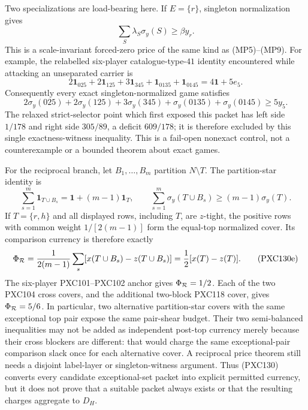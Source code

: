 \documentclass[11pt]{article}
\newcommand{\one}{\mathbf 1}
\begin{document}
Two specializations are load-bearing here.  If $E=\{r\}$, singleton
normalization gives
\begin{equation}
                 \sum_S\lambda_S\sigma_y(S)\ge\beta y_r.
                                                               \tag{PXC130c}
\end{equation}
This is a scale-invariant forced-zero price of the same kind as
(MP5)--(MP9).  For example, the relabelled six-player catalogue-type-$41$
identity encountered while attacking an unseparated carrier is
\[
 2\one_{025}+2\one_{125}+3\one_{345}
 +\one_{0135}+\one_{0145}=4\one+5e_5.
\]
Consequently every exact singleton-normalized game satisfies
\[
 2\sigma_y(025)+2\sigma_y(125)+3\sigma_y(345)
 +\sigma_y(0135)+\sigma_y(0145)\ge5y_5.
\]
The relaxed strict-selector point which first exposed this packet has left
side $1/178$ and right side $305/89$, a deficit $609/178$; it is therefore
excluded by this single exactness-witness inequality.  This is a fail-open
nonexact control, not a counterexample or a bounded theorem about exact
games.

For the reciprocal branch, let $B_1,\ldots,B_m$ partition $N\setminus T$.
The partition-star identity is
\begin{equation}
 \sum_{s=1}^m\one_{T\cup B_s}
       =\one+(m-1)\one_T,\qquad
 \sum_{s=1}^m\sigma_y(T\cup B_s)
       \ge(m-1)\sigma_y(T).                         \tag{PXC130d}
\end{equation}
If $T=\{r,h\}$ and all displayed rows, including $T$, are $z$-tight, the
positive rows with common weight $1/[2(m-1)]$ form the equal-top normalized
cover.  Its comparison currency is therefore exactly
\begin{equation}
 \Phi_{\cal R}
 =\frac{1}{2(m-1)}\sum_s[x(T\cup B_s)-z(T\cup B_s)]
 =\frac12[x(T)-z(T)].                               \tag{PXC130e}
\end{equation}
The six-player PXC101--PXC102 anchor gives $\Phi_{\cal R}=1/2$.
Each of the two PXC104
cross covers, and the additional two-block PXC118 cover, gives
$\Phi_{\cal R}=5/6$.  In particular, two alternative partition-star covers
with the same exceptional top pair expose the same pair-shear budget.
Their two semi-balanced inequalities may not be added as independent
post-top currency merely because their cross blockers are different: that
would charge the same exceptional-pair comparison slack once for each
alternative cover.  A reciprocal price theorem still needs a disjoint
label-layer or singleton-witness argument.  Thus (PXC130) converts every
candidate exceptional-set packet into explicit permitted currency, but it
does not prove that a suitable packet always exists or that the resulting
charges aggregate to $D_H$.
\end{document}
